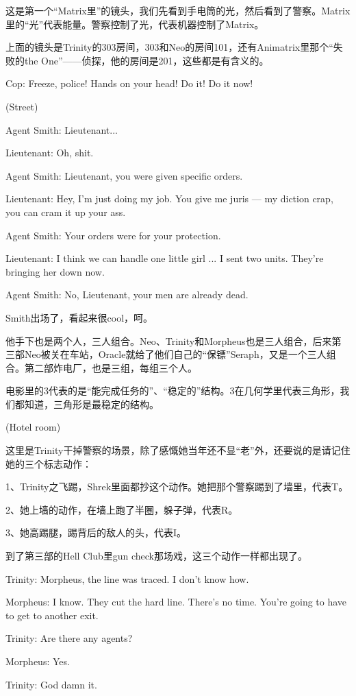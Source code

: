 \documentclass[UTF8]{ctexart}
\newenvironment{myquote}{\color{green} \setlength{\leftskip}{6em} \setlength{\rightskip}{4em} \setlength{\parindent}{-2em}}{\par}
\begin{document}
这是第一个“Matrix里”的镜头，我们先看到手电筒的光，然后看到了警察。Matrix里的“光”代表能量。警察控制了光，代表机器控制了Matrix。

上面的镜头是Trinity的303房间，303和Neo的房间101，还有Animatrix里那个“失败的the One”——侦探，他的房间是201，这些都是有含义的。

\begin{myquote}
Cop: Freeze, police! Hands on your head! Do it! Do it now!

(Street)

Agent Smith: Lieutenant...

Lieutenant: Oh, shit.

Agent Smith: Lieutenant, you were given specific orders.

Lieutenant: Hey, I'm just doing my job. You give me juris --- my diction crap, you can cram it up your ass.

Agent Smith: Your orders were for your protection.

Lieutenant: I think we can handle one little girl ... I sent two units. They're bringing her down now.

Agent Smith: No, Lieutenant, your men are already dead.
\end{myquote}

Smith出场了，看起来很cool，呵。

他手下也是两个人，三人组合。Neo、Trinity和Morpheus也是三人组合，后来第三部Neo被关在车站，Oracle就给了他们自己的“保镖”Seraph，又是一个三人组合。第二部炸电厂，也是三组，每组三个人。

电影里的3代表的是“能完成任务的”、“稳定的”结构。3在几何学里代表三角形，我们都知道，三角形是最稳定的结构。

\begin{myquote}
(Hotel room)
\end{myquote}

这里是Trinity干掉警察的场景，除了感慨她当年还不显“老”外，还要说的是请记住她的三个标志动作：

1、Trinity之飞踢，Shrek里面都抄这个动作。她把那个警察踢到了墙里，代表T。

2、她上墙的动作，在墙上跑了半圈，躲子弹，代表R。

3、她高踢腿，踢背后的敌人的头，代表I。

到了第三部的Hell Club里gun check那场戏，这三个动作一样都出现了。

\begin{myquote}
Trinity: Morpheus, the line was traced. I don't know how.

Morpheus: I know. They cut the hard line. There's no time. You're going to have to get to another exit.

Trinity: Are there any agents?

Morpheus: Yes.

Trinity: God damn it.
\end{myquote}
\end{document}
